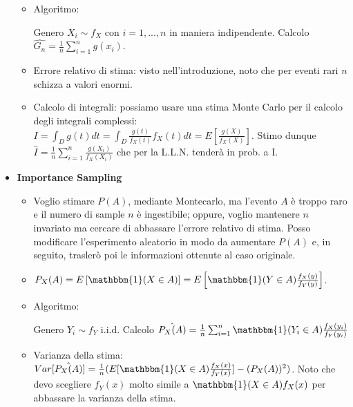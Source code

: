 \documentclass[8pt]{extarticle}
\begin{document}
\begin{multicols*}{3}
\begin{itemize}
\begin{itemize}
                  \item Algoritmo:
                        \begin{algorithmic}[1]
                            \State Genero $X_{i}\sim f_{X}$ con $i=1,...,n$ in maniera indipendente.
                            \State Calcolo $\hat{G_{n}}=\frac{1}{n}\sum_{i=1}^{n}g(x_{i})$.
                        \end{algorithmic}
                  \item Errore relativo di stima: visto nell'introduzione, noto che per eventi rari $n$ schizza a valori enormi.
                  \item Calcolo di integrali: possiamo usare una stima Monte Carlo per il calcolo degli integrali complessi: \newline
                        $I=\int_{D}g(t)dt=\int_{D}\frac{g(t)}{f_{X}(t)}f_{X}(t)dt=E[\frac{g(X)}{f_{X}(X)}]$. \newline
                        Stimo dunque $\hat{I}=\frac{1}{n}\sum_{i=1}^{n}\frac{g(X_{i})}{f_{X}(X_{i})}$ che per la L.L.N. tenderà in prob. a I.
              \end{itemize}
        \item \textbf{Importance Sampling}
              \begin{itemize}
                  \item Voglio stimare $P(A)$, mediante Montecarlo, ma l'evento $A$ è troppo raro e il numero di sample $n$ è ingestibile; oppure, voglio mantenere $n$ invariato ma cercare di abbassare l'errore relativo di stima. Posso modificare l'esperimento aleatorio in modo da aumentare $P(A)$ e, in seguito, traslerò poi le informazioni ottenute al caso originale.
                  \item $P_{X}(A)=E\left[\mathbbm{1}(X\in A)\right]=E\left[{\mathbbm{1}(Y\in A)\frac{f_{X}(y)}{f_{Y}(y)}}\right]$.
                  \item Algoritmo:
                        \begin{algorithmic}[1]
                            \State Genero $Y_{i}\sim f_{Y}$ i.i.d.
                            \State Calcolo $\hat{P_{X}(A)}=\frac{1}{n}\sum_{i=1}^{n}\mathbbm{1}(Y_{i}\in A)\frac{f_{X}(y_{i})}{f_{Y}(y_{i})}$
                        \end{algorithmic}
                  \item Varianza della stima: \newline
                        $Var[\hat{P_{X}(A)}]=\frac{1}{n}(E[\mathbbm{1}(X\in A)\frac{f_{X}(x)}{f_{Y}(x)}]-(P_{X}(A))^{2})$. \newline
                        Noto che devo scegliere $f_{Y}(x)$ molto simile a $\mathbbm{1}(X\in A)f_{X}(x)$ per abbassare la varianza della stima.
              \end{itemize}
    \end{itemize}


\end{multicols*}
\end{document}
